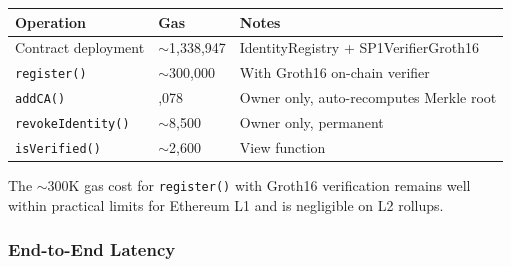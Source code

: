 \documentclass[11pt, a4paper]{article}
\begin{document}
\begin{longtable}[]{@{}
  >{\raggedright\arraybackslash}p{}
  >{\raggedright\arraybackslash}p{}
  >{\raggedright\arraybackslash}p{}@{}}
\toprule\noalign{}
\begin{minipage}[b]{\linewidth}\raggedright
Operation
\end{minipage} & \begin{minipage}[b]{\linewidth}\raggedright
Gas
\end{minipage} & \begin{minipage}[b]{\linewidth}\raggedright
Notes
\end{minipage} \\
\midrule\noalign{}
\endhead
\bottomrule\noalign{}
\endlastfoot
Contract deployment & $\sim$1,338,947 & IdentityRegistry +
SP1VerifierGroth16 \\
\texttt{register()} & $\sim$300,000 & With Groth16 on-chain
verifier \\
\texttt{addCA()} & 26,078 & Owner only, auto-recomputes Merkle root \\
\texttt{revokeIdentity()} & $\sim$8,500 & Owner only,
permanent \\
\texttt{isVerified()} & $\sim$2,600 & View function \\
\end{longtable}

The $\sim$300K gas cost for \texttt{register()} with Groth16
verification remains well within practical limits for Ethereum L1 and is
negligible on L2 rollups.

\subsubsection{End-to-End Latency}\label{end-to-end-latency}
\end{document}
